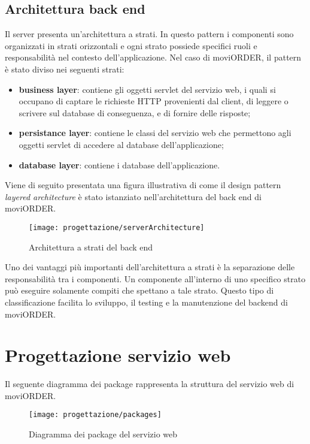 \subsection{Architettura back end}

Il server presenta un'architettura a strati. In questo pattern i componenti sono organizzati in strati orizzontali e ogni strato possiede specifici ruoli e responsabilità nel contesto dell'applicazione. Nel caso di moviORDER, il pattern è stato diviso nei seguenti strati:
\begin{itemize}
	\item \textbf{business layer}: contiene gli oggetti servlet del servizio web, i quali si occupano di captare le richieste HTTP provenienti dal client, di leggere o scrivere sul database di conseguenza, e di fornire delle risposte;
	\item \textbf{persistance layer}: contiene le classi del servizio web che permettono agli oggetti servlet di accedere al database dell'applicazione;
	\item \textbf{database layer}: contiene i database dell'applicazione.
\end{itemize}
Viene di seguito presentata una figura illustrativa di come il design pattern \textit{layered architecture} è stato istanziato nell'architettura del back end di moviORDER. 

\begin{figure}[!h] 
    \centering 
    \texttt{[image: progettazione/serverArchitecture]} 
    \caption{Architettura a strati del back end}
\end{figure}

Uno dei vantaggi più importanti dell'architettura a strati è la separazione delle responsabilità tra i componenti. Un componente all'interno di uno specifico strato può eseguire solamente compiti che spettano a tale strato. Questo tipo di classificazione facilita lo sviluppo, il testing e la manutenzione del backend di moviORDER.

\section{Progettazione servizio web}

Il seguente diagramma dei package rappresenta la struttura del servizio web di moviORDER.

\begin{figure}[!h] 
    \centering 
    \texttt{[image: progettazione/packages]} 
    \caption{Diagramma dei package del servizio web}
\end{figure}

